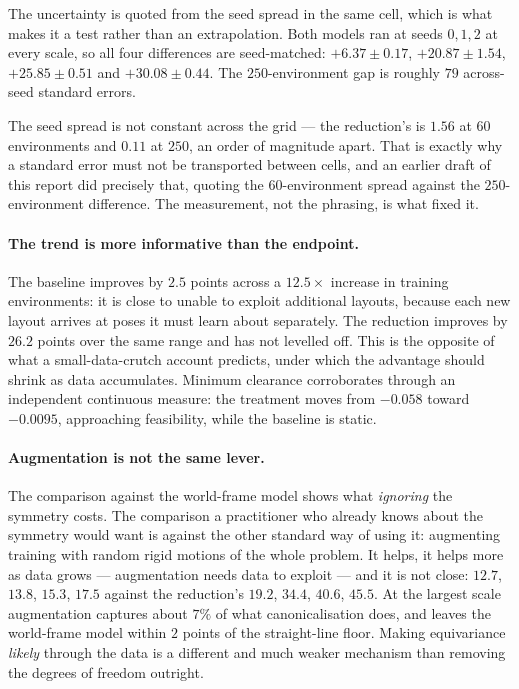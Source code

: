 \documentclass[11pt,a4paper]{article}
\begin{document}
The uncertainty is quoted from the seed spread in the same cell, which is what
makes it a test rather than an extrapolation. Both models ran at seeds $0,1,2$ at
every scale, so all four differences are seed-matched: $+6.37 \pm 0.17$,
$+20.87 \pm 1.54$, $+25.85 \pm 0.51$ and $+30.08 \pm 0.44$. The
$250$-environment gap is roughly $79$ across-seed standard errors.

The seed spread is not constant across the grid --- the reduction's is $1.56$ at
$60$ environments and $0.11$ at $250$, an order of magnitude apart. That is
exactly why a standard error must not be transported between cells, and an
earlier draft of this report did precisely that, quoting the $60$-environment
spread against the $250$-environment difference. The measurement, not the
phrasing, is what fixed it.

\paragraph{The trend is more informative than the endpoint.} The baseline
improves by $2.5$ points across a $12.5\times$ increase in training environments:
it is close to unable to exploit additional layouts, because each new layout
arrives at poses it must learn about separately. The reduction improves by $26.2$
points over the same range and has not levelled off. This is the opposite of what
a small-data-crutch account predicts, under which the advantage should shrink as
data accumulates. Minimum clearance corroborates through an independent
continuous measure: the treatment moves from $-0.058$ toward $-0.0095$,
approaching feasibility, while the baseline is static.

\paragraph{Augmentation is not the same lever.} The comparison against the
world-frame model shows what \emph{ignoring} the symmetry costs. The comparison a
practitioner who already knows about the symmetry would want is against the other
standard way of using it: augmenting training with random rigid motions of the
whole problem. It helps, it helps more as data grows --- augmentation needs data
to exploit --- and it is not close: $12.7$, $13.8$, $15.3$, $17.5$ against the
reduction's $19.2$, $34.4$, $40.6$, $45.5$. At the largest scale augmentation
captures about $7\%$ of what canonicalisation does, and leaves the world-frame model
within $2$ points of the straight-line floor. Making equivariance \emph{likely}
through the data is a different and much weaker mechanism than removing the
degrees of freedom outright.
\end{document}

